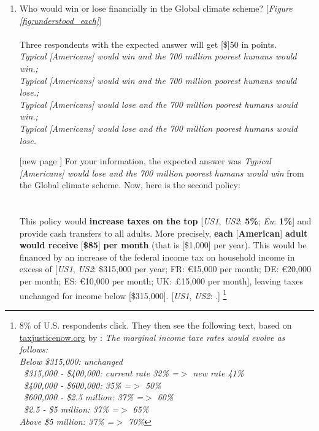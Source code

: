 \begin{enumerate}[resume]
\item \label{q:understood_gcs} Who would win or lose financially in the Global climate scheme? [\textit{Figure \ref{fig:understood_each}}] \\
\\
Three respondents with the expected answer will get [\$]50 in points.
\\ \textit{Typical [Americans] would win and the 700 million poorest humans would win.; \\Typical [Americans] would win and the 700 million poorest humans would lose.; \\Typical [Americans] would lose and the 700 million poorest humans would win.; \\Typical [Americans] would lose and the 700 million poorest humans would lose.}
\item[[new page\!\!\!]] For your information, the expected answer was \textit{Typical [Americans] would lose and the 700 million poorest humans would win} from the Global climate scheme. Now, here is the second policy: \\ 
\\
\textbf{}\\ This policy would \textbf{increase taxes on the top} [\textit{US1}, \textit{US2}: \textbf{5\%}; 
\textit{Eu}: \textbf{1\%}] and provide cash transfers to all adults. More precisely, \textbf{each }[\textbf{American}]\textbf{ adult would receive }[\textbf{\$85}]\textbf{ per month} (that is [\$1,000] per year). 
This would be financed by an increase of the federal income tax on household income in excess of [\textit{US1}, \textit{US2}: \$315,000 per year; FR: \euro{}15,000 per month; DE: \euro{}20,000 per month; ES: \euro{}10,000 per month; UK: £15,000 per month], leaving taxes unchanged for income below [\$315,000]. [\textit{US1}, \textit{US2}: .]
\footnote{8\% of U.S. respondents click. They then see the following text, based on \href{https://taxjusticenow.org/\#makeYourOwnTaxPlan}{taxjusticenow.org} by \citet{saez_triumph_2019}: \textit{The marginal income taxe rates would evolve as follows:\\Below \$315,000: unchanged \\ ~\$315,000 - \$400,000: current rate 32\% =$>$ new rate 41\% \\ ~\$400,000 - \$600,000: 35\% =$>$ 50\% \\ ~\$600,000 - \$2.5 million: 37\% =$>$ 60\% \\ ~\$2.5 - \$5 million: 37\% =$>$ 65\% \\ Above \$5 million: 37\% =$>$ 70\%}}

\end{enumerate}
